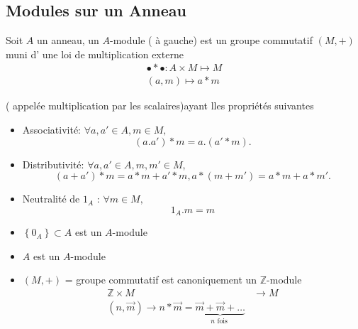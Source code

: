 \documentclass[../main.tex]{subfiles}
\begin{document}
\subsection{Modules sur un Anneau}
\begin{defn}\label{defn:modules_sur_un_anneau}
	Soit $A$ un anneau, un $A$-module ( à gauche) est un groupe commutatif $(M,+)$ muni d' une loi de multiplication externe
	\begin{align*}
	\bullet \ast \bullet : A \times M \mapsto M\\
	( a,m) \mapsto a \ast m
	\end{align*}
	
	( appelée multiplication par les scalaires)ayant lles propriétés suivantes
	\begin{itemize}
	\item Associativité: $\forall a,a' \in A, m \in M,$ 
		\[ 
			( a.a') \ast m = a.(a'\ast m).
		\]
		
	\item Distributivité: $\forall a,a' \in A, m,m' \in M$,
		\[ 
			( a+a') \ast m = a \ast m + a' \ast m, a \ast ( m +m') = a \ast m + a \ast m'.
		\]
		
	\item Neutralité de $1_A$ : $\forall m \in M,$ 
		\[ 
		1_A . m = m
		\]
		
	\end{itemize}
	
\end{defn}
\begin{exemple}
\begin{itemize}
\item $ \left\{ 0_A \right\}  \subset A$ est un $A$-module
\item $A$ est un $A$-module
\item $(M,+)$ = groupe commutatif est canoniquement un $\mathbb{Z}$-module
	\begin{align*}
		\mathbb{Z} \times M &\to M\\
		( n, \vec{m}) \to n \ast \vec{m} = \underbrace{\vec{m} + \vec{m} + \ldots}_{n \text{ fois } }
	\end{align*}
	
	
\end{itemize}

\end{exemple}
\end{document}
